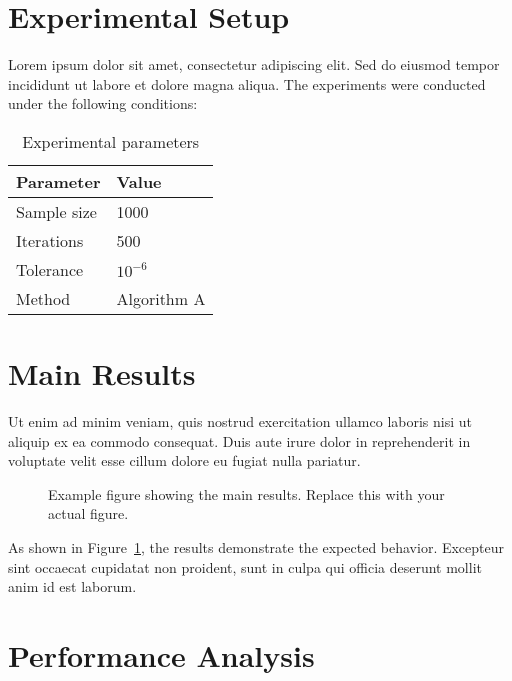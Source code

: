 \documentclass[../main.tex]{subfiles}
\begin{document}
\section{Experimental Setup}

Lorem ipsum dolor sit amet, consectetur adipiscing elit. Sed do eiusmod tempor incididunt ut labore et dolore magna aliqua. The experiments were conducted under the following conditions:

\begin{table}[H]
\centering
\caption{Experimental parameters}
\label{tab:parameters}
\begin{tabular}{ll}
\hline
\textbf{Parameter} & \textbf{Value} \\
\hline
Sample size & 1000 \\
Iterations & 500 \\
Tolerance & $10^{-6}$ \\
Method & Algorithm A \\
\hline
\end{tabular}
\end{table}

\section{Main Results}

Ut enim ad minim veniam, quis nostrud exercitation ullamco laboris nisi ut aliquip ex ea commodo consequat. Duis aute irure dolor in reprehenderit in voluptate velit esse cillum dolore eu fugiat nulla pariatur.

\begin{figure}[H]
    \centering
    \caption{Example figure showing the main results. Replace this with your actual figure.}
    \label{fig:main_result}
\end{figure}

As shown in Figure~\ref{fig:main_result}, the results demonstrate the expected behavior. Excepteur sint occaecat cupidatat non proident, sunt in culpa qui officia deserunt mollit anim id est laborum.

\section{Performance Analysis}
\end{document}
